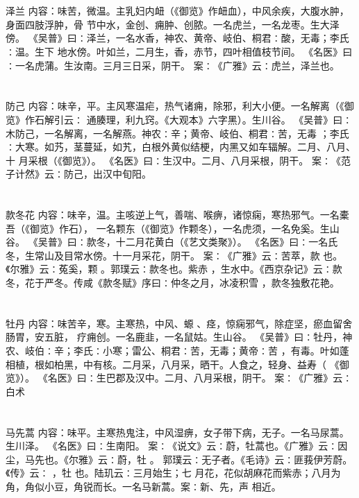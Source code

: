 \documentclass[12pt,UTF8]{ctexbook}
\begin{document}
\chapter{}泽兰
内容：味苦，微温。主乳妇内衄（《御览》作衄血），中风余疾，大腹水肿，身面四肢浮肿，骨 
节中水，金创、痈肿、创脓。一名虎兰，一名龙枣。生大泽傍。 
《吴普》曰∶泽兰，一名水香，神农、黄帝、岐伯、桐君∶酸，无毒；李氏∶温。生下 
地水傍。叶如兰，二月生，香，赤节，四叶相值枝节间。 
《名医》曰∶一名虎蒲。生汝南。三月三日采，阴干。 
案∶《广雅》云∶虎兰，泽兰也。 


\chapter{}防己
内容：味辛，平。主风寒温疟，热气诸痈，除邪，利大小便。一名解离（《御览》作石解引云∶ 
通腠理，利九窍。《大观本》六字黑）。生川谷。 
《吴普》曰∶木防己，一名解离，一名解燕。神农∶辛；黄帝、岐伯、桐君∶苦，无毒 
；李氏∶大寒。如艿，茎蔓延，如艽，白根外黄似结梗，内黑又如车辐解。二月、八月、十 
月采根（《御览》）。 
《名医》曰∶生汉中。二月、八月采根，阴干。 
案∶《范子计然》云∶防己，出汉中旬阳。 


\chapter{}款冬花
内容：味辛，温。主咳逆上气，善喘、喉痹，诸惊痫，寒热邪气。一名橐吾（《御览》作石）， 
一名颗东（《御览》作颗冬），一名虎须，一名免奚。生山谷。 
《吴普》曰∶款冬，十二月花黄白（《艺文类聚》）。 
《名医》曰∶一名氏冬，生常山及目常水傍。十一月采花，阴干。 
案∶《广雅》云∶苦萃，款 也。《尔雅》云∶菟奚，颗 。郭璞云∶款冬也。紫赤 
，生水中。《西京杂记》云∶款冬，花于严冬。传咸《款冬赋》序曰∶仲冬之月，冰凌积雪 
，款冬独敷花艳。 


\chapter{}牡丹
内容：味苦辛，寒。主寒热，中风、螈 、痉，惊痫邪气，除症坚，瘀血留舍肠胃，安五脏， 
疗痈创。一名鹿韭，一名鼠姑。生山谷。 
《吴普》曰∶牡丹，神农、岐伯∶辛；李氏∶小寒；雷公、桐君∶苦，无毒；黄帝∶苦 
，有毒。叶如蓬相植，根如柏黑，中有核。二月采，八月采，晒干。人食之，轻身、益寿（ 
《御览》）。 
《名医》曰∶生巴郡及汉中。二月、八月采根，阴干。 
案∶《广雅》云∶白术 


\chapter{}马先蒿
内容：味平。主寒热鬼注，中风湿痹，女子带下病，无子。一名马尿蒿。生川泽。 
《名医》曰∶生南阳。 
案∶《说文》云∶蔚，牡蒿也。《广雅》云∶因尘，马先也。《尔雅》云∶蔚，牡 。 
郭璞云∶无子者。《毛诗》云∶匪莪伊芳蔚。《传》云∶ ，牡 也。陆玑云∶三月始生；七 
月花，花似胡麻花而紫赤；八月为角，角似小豆，角锐而长。一名马新蒿。案∶新、先，声 
相近。 
\end{document}
